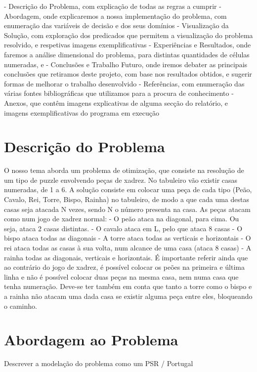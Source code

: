 \documentclass[runningheads]{llncs}
\begin{document}
 - Descrição do Problema, com explicação de todas as regras a cumprir
 - Abordagem, onde explicaremos a nossa implementação do problema, com enumeração das variáveis de decisão e dos seus domínios
 - Visualização da Solução, com exploração dos predicados que permitem a visualização do problema resolvido, e respetivas imagens exemplificativas
 - Experiências e Resultados, onde faremos a análise dimensional do problema, para distintas quantidades de células numeradas, e  
 - Conclusões e Trabalho Futuro, onde iremos debater as principais conclusões que retiramos deste projeto, com base nos resultados obtidos, e sugerir formas de melhorar o trabalho desenvolvido
 - Referências, com enumeração das várias fontes bibliográficas que utilizamos para a procura de conhecimento
 - Anexos, que contêm imagens explicativas de alguma secção do relatório, e imagens exemplificativas do programa em execução

\section{Descrição do Problema}
O nosso tema aborda um problema de otimização, que consiste na resolução de um tipo de puzzle envolvendo peças de xadrez. No tabuleiro vão existir casas numeradas, de 1 a 6. A solução consiste em colocar uma peça de cada tipo (Peão, Cavalo, Rei, Torre, Bispo, Rainha) no tabuleiro, de modo a que cada uma destas casas seja
atacada N vezes, sendo N o número presenta na casa. As peças atacam como num jogo de xadrez normal:
 - O peão ataca na diagonal, para cima. Ou seja, ataca 2 casas distintas.
 - O cavalo ataca em L, pelo que ataca 8 casas 
 - O bispo ataca todas as diagonais
 - A torre ataca todas as verticais e horizontais
 - O rei ataca todas as casas à sua volta, num alcance de uma casa (ataca 8 casas)
 - A rainha todas as diagonais, verticais e horizontais.
É importante referir ainda que ao contrário do jogo de xadrez, é possível colocar os peões 
na primeira e última linha e não é possível colocar duas peças na mesma casa, nem numa casa que tenha numeração.
Deve-se ter também em conta que tanto a torre como o bispo e a rainha não atacam uma dada casa se existir alguma peça entre eles, bloqueando o caminho.

\newpage
\section{Abordagem ao Problema}
Descrever a modelação do problema como um PSR / Portugal
\end{document}
